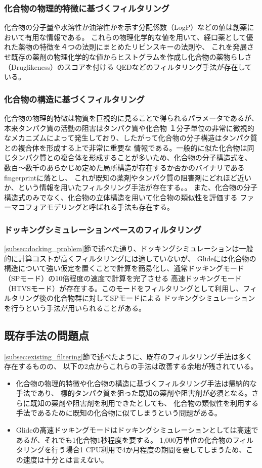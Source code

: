 \subsubsection{化合物の物理的特徴に基づくフィルタリング}
化合物の分子量や水溶性か油溶性かを示す分配係数（LogP）などの値は創薬において有用な情報である。
これらの物理化学的な値を用いて、経口薬として優れた薬物の特徴を４つの法則にまとめたリピンスキーの法則や、
これを発展させ既存の薬剤の物理化学的な値からヒストグラムを作成し化合物の薬物らしさ（Druglikeness）のスコアを付ける
QED\cite{Bickerton2012}などのフィルタリング手法が存在している。
\subsubsection{化合物の構造に基づくフィルタリング}
化合物の物理的特徴は物質を巨視的に見ることで得られるパラメータであるが、本来タンパク質の活動の阻害はタンパク質や化合物
１分子単位の非常に微視的なメカニズムによって発生しており、したがって化合物の分子構造はタンパク質との複合体を形成する上で非常に重要な
情報である。一般的に似た化合物は同じタンパク質との複合体を形成することが多いため、化合物の分子構造式を、
数百～数千のあらかじめ定めた局所構造が存在するか否かのバイナリであるfingerprintに落とし、
これが既知の薬剤やタンパク質の阻害剤にどれほど近いか、という情報を用いたフィルタリング手法が存在する。\cite{Nilakantan1993}。
また、化合物の分子構造式のみでなく、化合物の立体構造を用いて化合物の類似性を評価する
ファーマコフォアモデリングと呼ばれる手法も存在する\cite{Parenti2003}。
\subsubsection{ドッキングシミュレーションベースのフィルタリング}
\ref{subsec:docking_problem}節で述べた通り、ドッキングシミュレーションは一般的に計算コストが高くフィルタリングには適していないが、
Glideには化合物の構造について強い仮定を置くことで計算を簡易化し、通常ドッキングモード（SPモード）の10倍程度の速度で計算を完了させる
高速ドッキングモード（HTVSモード）が存在する。このモードをフィルタリングとして利用し、フィルタリング後の化合物群に対してSPモードによる
ドッキングシミュレーションを行うという手法が用いられることがある\cite{Fujimoto2008}。

\subsection{既存手法の問題点}
\ref{subsec:existing_filtering}節で述べたように、既存のフィルタリング手法は多く存在するものの、
以下の2点からこれらの手法は改善する余地が残されている。
\begin{itemize}
\item 化合物の物理的特徴や化合物の構造に基づくフィルタリング手法は帰納的な手法であり、
	標的タンパク質を狙った既知の薬剤や阻害剤が必須となる。さらに既知の薬剤や阻害剤を利用できたとしても、
	化合物の類似性を利用する手法であるために既知の化合物に似てしまうという問題がある。	
\item Glideの高速ドッキングモードはドッキングシミュレーションとしては高速であるが、それでも1化合物1秒程度を要する。
	1,000万単位の化合物のフィルタリングを行う場合1 CPU利用で4か月程度の期間を要してしまうため、この速度は十分とは言えない。
\end{itemize}
